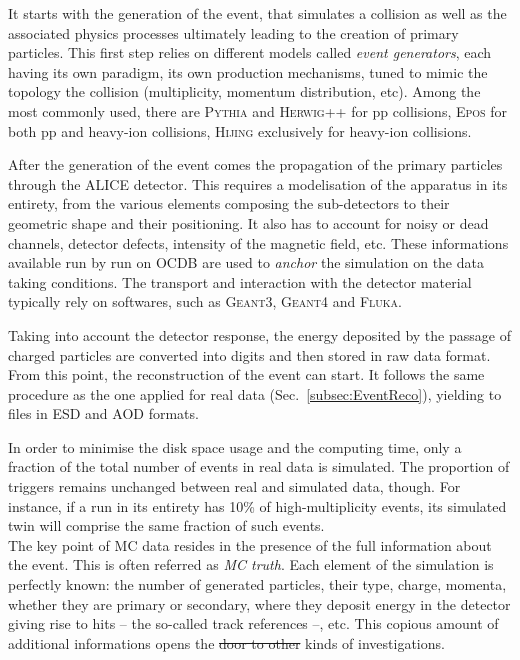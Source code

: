 \documentclass[ALICE,manyauthors]{cernphprep}
\newcommand{\Sec}       {\textsc{S}ec.~}
\newcommand{\Herwig}        {\textsc{Herwig++}\xspace}
\newcommand{\Epos}          {\textsc{Epos}\xspace}
\newcommand{\Pythia}        {\textsc{Pythia}\xspace}
\newcommand{\Hijing}        {\textsc{Hijing}\xspace}
\newcommand{\GeantThree}    {\textsc{Geant3}\xspace}
\newcommand{\GeantFour}     {\textsc{Geant4}\xspace}
\newcommand{\Fluka}         {\textsc{Fluka}\xspace}
\providecommand{\DIFaddtex}[1]{{\protect\color{blue}\uwave{#1}}} %
\providecommand{\DIFdeltex}[1]{{\protect\color{red}\sout{#1}}}                      %
\providecommand{\DIFaddbegin}{} %
\providecommand{\DIFaddend}{} %
\providecommand{\DIFdelbegin}{} %
\providecommand{\DIFdelend}{} %
\providecommand{\DIFadd}[1]{\texorpdfstring{\DIFaddtex{#1}}{#1}} %
\providecommand{\DIFdel}[1]{\texorpdfstring{\DIFdeltex{#1}}{}} %
\newcommand{\DIFscaledelfig}{0.5}
\newlength{\DIFdelgraphicswidth} %
\newlength{\DIFdelgraphicsheight} %
\newcommand{\DIFaddincludegraphics}[2][]{{\color{blue}\fbox{\DIFOincludegraphics[#1]{#2}}}} %
\newcommand{\DIFdelincludegraphics}[2][]{%
\sbox{\DIFdelgraphicsbox}{\DIFOincludegraphics[#1]{#2}}%
\settoboxwidth{\DIFdelgraphicswidth}{\DIFdelgraphicsbox} %
\settoboxtotalheight{\DIFdelgraphicsheight}{\DIFdelgraphicsbox} %
\scalebox{\DIFscaledelfig}{%
\parbox[b]{\DIFdelgraphicswidth}{\usebox{\DIFdelgraphicsbox}\\[-\baselineskip] \rule{\DIFdelgraphicswidth}{0em}}\llap{\resizebox{\DIFdelgraphicswidth}{\DIFdelgraphicsheight}{%
\setlength{\unitlength}{\DIFdelgraphicswidth}%
\begin{picture}(1,1)%
\thicklines\linethickness{2pt} %
{\color[rgb]{1,0,0}\put(0,0){\framebox(1,1){}}}%
{\color[rgb]{1,0,0}\put(0,0){\line( 1,1){1}}}%
{\color[rgb]{1,0,0}\put(0,1){\line(1,-1){1}}}%
\end{picture}%
}\hspace*{3pt}}} %
} %
\DeclareRobustCommand{\DIFaddbegin}{\DIFOaddbegin \let\includegraphics\DIFaddincludegraphics} %
\DeclareRobustCommand{\DIFaddend}{\DIFOaddend \let\includegraphics\DIFOincludegraphics} %
\DeclareRobustCommand{\DIFdelbegin}{\DIFOdelbegin \let\includegraphics\DIFdelincludegraphics} %
\DeclareRobustCommand{\DIFdelend}{\DIFOaddend \let\includegraphics\DIFOincludegraphics} %
\begin{document}
It starts with the generation of the event, that simulates a collision as well as the associated physics processes ultimately leading to the creation of primary particles. This first step relies on different models called \textit{event generators}, each having its own paradigm, its own production mechanisms, tuned to mimic the topology the collision (multiplicity, momentum distribution, etc). Among the most commonly used, there are \Pythia \cite{bierlichComprehensiveGuidePhysics2022} and \Herwig \cite{bahrHerwigPhysicsManual2008} for pp collisions, \Epos \cite{pierogEPOSLHCTest2015} for both pp and heavy-ion collisions, \Hijing \cite{wangHIJINGMonteCarlo1994} exclusively for heavy-ion collisions.

After the generation of the event comes the propagation of the primary particles through the ALICE detector. This requires a modelisation of the apparatus in its entirety, from the various elements composing the sub-detectors to their geometric shape and their positioning. It also has to account for noisy or dead channels, detector defects, intensity of the magnetic field, etc. These informations available run by run on OCDB are used to \textit{anchor} the simulation on the \DIFaddbegin \DIFadd{actual }\DIFaddend data taking conditions. The transport and interaction with the detector material typically rely on \DIFaddbegin \DIFadd{dedicated }\DIFaddend softwares, such as \GeantThree \cite{brunGEANTUserGuide1987}, \GeantFour \cite{geant4Geant4HomePage} and \Fluka \cite{battistoniOverviewFLUKACode2015}.

Taking into account the detector response, the energy deposited by the passage of charged particles are converted into digits and then stored in raw data format. From this point, the reconstruction of the event can start. It follows the same procedure as the one applied for real data (\Sec\ref{subsec:EventReco}), yielding to files in ESD and AOD formats.

In order to minimise the disk space usage and the computing time, only a fraction of the total number of events in real data is simulated. The proportion of triggers remains unchanged between real and simulated data, though. For instance, if a run in its entirety has 10\% of high-multiplicity events, its simulated twin will comprise the same fraction of such events.\\

The key point of MC data resides in the presence of the full information about the event. This is often referred as \textit{MC truth}. Each element of the simulation is perfectly known: the number of generated particles, their type, charge, momenta, whether they are primary or secondary, where they deposit energy in the detector giving rise to hits -- the so-called track references --, etc. This copious amount of additional informations opens the \DIFdelbegin \DIFdel{door to other }\DIFdelend \DIFaddbegin \DIFadd{way towards specific }\DIFaddend kinds of investigations. 
\end{document}
